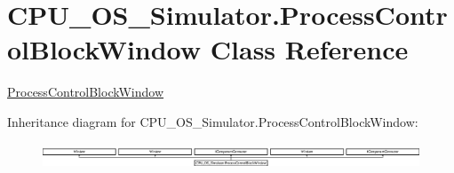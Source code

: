 \hypertarget{class_c_p_u___o_s___simulator_1_1_process_control_block_window}{}\section{C\+P\+U\+\_\+\+O\+S\+\_\+\+Simulator.\+Process\+Control\+Block\+Window Class Reference}
\label{class_c_p_u___o_s___simulator_1_1_process_control_block_window}


\hyperlink{class_c_p_u___o_s___simulator_1_1_process_control_block_window}{Process\+Control\+Block\+Window}  


Inheritance diagram for C\+P\+U\+\_\+\+O\+S\+\_\+\+Simulator.\+Process\+Control\+Block\+Window\+:\begin{figure}[H]
\begin{center}
\leavevmode
\includegraphics[height=0.759322cm]{class_c_p_u___o_s___simulator_1_1_process_control_block_window}
\end{center}
\end{figure}
